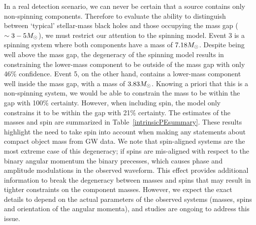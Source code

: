 In a real detection scenario, we can never be certain that a source contains
only non-spinning components.  Therefore to evaluate the ability to distinguish
between `typical' stellar-mass black holes and those occupying the mass gap
($\sim 3 - 5 M_\odot$), we must restrict our attention to the spinning \imr
model.  Event 3 is a spinning system where both components have a mass of 
$7.18 M_\odot$.
Despite being well above the mass gap, the degeneracy of the spinning model
results in constraining the lower-mass component to be outside of the mass gap
with only 46\% confidence.  Event 5, on the other hand, contains a lower-mass
component well inside the mass gap, with a mass of $3.83 M_\odot$.  Knowing a
priori that this is a non-spinning system, we would be able to constrain the
mass to be within the gap with 100\% certainty.  However, when including spin,
the \imr model only constrains it to be within the gap with 21\% certainty. The
estimates of the masses and spin are summarized in
Table~\ref{intrinsicPEsummary}.  These results highlight the need to take spin
into account when making any statements about compact object mass from GW data.
We note that spin-aligned systems are the most extreme case of this degeneracy;
if spins are mis-aligned with respect to the binary angular momentum the binary
precesses, which causes phase and amplitude modulations in the observed
waveform. This effect provides additional information to break the degeneracy
between masses and spins that may result in tighter constraints on the
component masses. However, we expect the exact details to depend on the actual
parameters of the observed systems (masses, spins and orientation of the
angular momenta), and studies are ongoing to address this issue.


